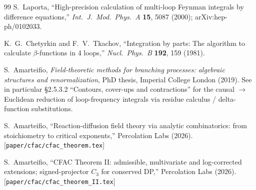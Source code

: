 \documentclass[11pt,a4paper]{article}
\theoremstyle{definition}
\theoremstyle{plain}
\begin{document}
\begin{thebibliography}{99}
  S.~Laporta,
  ``High-precision calculation of multi-loop Feynman integrals
  by difference equations,''
  \textit{Int.\ J.\ Mod.\ Phys.\ A} \textbf{15}, 5087 (2000);
  arXiv:hep-ph/0102033.

  K.~G.~Chetyrkin and F.~V.~Tkachov,
  ``Integration by parts: The algorithm to calculate $\beta$-functions
  in 4 loops,''
  \textit{Nucl.\ Phys.\ B} \textbf{192}, 159 (1981).

  S.~Amarteifio,
  \textit{Field-theoretic methods for branching processes:
  algebraic structures and renormalization},
  PhD thesis, Imperial College London (2019).
  See in particular \S 2.5.3.2 ``Contours, cover-ups and
  contractions'' for the causal $\to$ Euclidean reduction of
  loop-frequency integrals via residue calculus / delta-function
  substitutions.

  S.~Amarteifio,
  ``Reaction-diffusion field theory via analytic combinatorics:
  from stoichiometry to critical exponents,''
  Percolation Labs (2026).
  [\texttt{paper/cfac/cfac\_theorem.tex}]

  S.~Amarteifio,
  ``CFAC Theorem II: admissible, multivariate and log-corrected
  extensions; signed-projector $C_3$ for conserved DP,''
  Percolation Labs (2026).
  [\texttt{paper/cfac/cfac\_theorem\_II.tex}]

\end{thebibliography}
\end{document}
